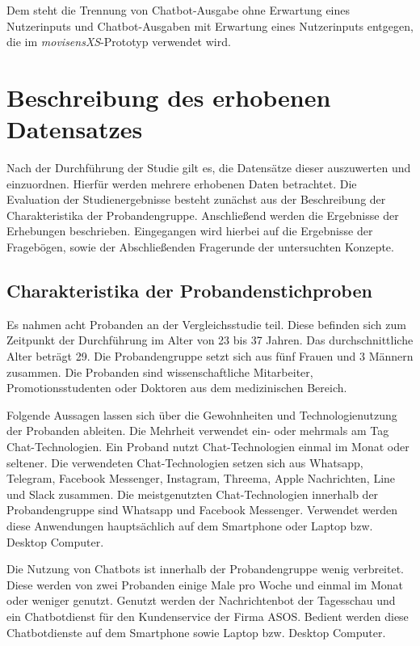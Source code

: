 Dem steht die Trennung von Chatbot-Ausgabe ohne Erwartung eines Nutzerinputs und Chatbot-Ausgaben mit Erwartung eines Nutzerinputs entgegen, die im \emph{movisensXS}-Prototyp verwendet wird. 




\section{Beschreibung des erhobenen Datensatzes}
Nach der Durchführung der Studie gilt es, die Datensätze dieser auszuwerten und einzuordnen. Hierfür werden mehrere erhobenen Daten betrachtet. Die Evaluation der Studienergebnisse besteht zunächst aus der Beschreibung der Charakteristika der Probandengruppe. Anschließend werden die Ergebnisse der Erhebungen beschrieben. Eingegangen wird hierbei auf die Ergebnisse der Fragebögen, sowie der Abschließenden Fragerunde der untersuchten Konzepte.  


\subsection{Charakteristika der Probandenstichproben}
Es nahmen acht Probanden an der Vergleichsstudie teil. Diese befinden sich zum Zeitpunkt der Durchführung im Alter von 23 bis 37 Jahren. Das durchschnittliche Alter beträgt 29. Die Probandengruppe setzt sich aus fünf Frauen und 3 Männern zusammen. Die Probanden sind wissenschaftliche Mitarbeiter, Promotionsstudenten oder Doktoren aus dem medizinischen Bereich. 

Folgende Aussagen lassen sich über die Gewohnheiten und Technologienutzung der Probanden ableiten. Die Mehrheit verwendet ein- oder mehrmals am Tag Chat-Technologien. Ein Proband nutzt Chat-Technologien 
einmal im Monat oder seltener. Die verwendeten Chat-Technologien setzen sich aus Whatsapp, Telegram, Facebook Messenger, Instagram, Threema, Apple Nachrichten, Line und Slack zusammen. Die meistgenutzten Chat-Technologien innerhalb der Probandengruppe sind Whatsapp und Facebook Messenger. Verwendet werden diese Anwendungen hauptsächlich auf dem Smartphone oder Laptop bzw. Desktop Computer. 

Die Nutzung von Chatbots ist innerhalb der Probandengruppe wenig verbreitet. Diese werden von zwei Probanden einige Male pro Woche und einmal im Monat oder weniger genutzt. Genutzt werden der Nachrichtenbot der Tagesschau und ein Chatbotdienst für den Kundenservice der Firma ASOS. Bedient werden diese Chatbotdienste auf dem Smartphone sowie Laptop bzw. Desktop Computer. 

